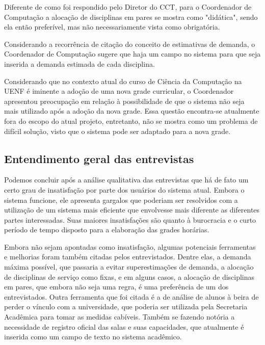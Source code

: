         Diferente de como foi respondido pelo Diretor do CCT, para o Coordenador de Computação a alocação de disciplinas em pares se mostra como "didática", sendo ela então preferível, mas não necessariamente vista como obrigatória.

        Considerando a recorrência de citação do conceito de estimativas de demanda, o Coordenador de Computação sugere que haja um campo no sistema para que seja inserida a demanda estimada de cada disciplina.

        Considerando que no contexto atual do curso de Ciência da Computação na UENF é iminente a adoção de uma nova grade curricular, o Coordenador apresentou preocupação em relação à possibilidade de que o sistema não seja mais utilizado após a adoção da nova grade. Essa questão encontra-se atualmente fora do escopo do atual projeto, entretanto, não se mostra como um problema de difícil solução, visto que o sistema pode ser adaptado para a nova grade.

    \subsection{Entendimento geral das entrevistas} %

        Podemos concluir após a análise qualitativa das entrevistas que há de fato um certo grau de insatisfação por parte dos usuários do sistema atual. Embora o sistema funcione, ele apresenta gargalos que poderiam ser resolvidos com a utilização de um sistema mais eficiente que envolvesse mais diferente as diferentes partes interessadas. Suas maiores insatisfações são quanto à burocracia e o curto período de tempo disposto para a elaboração das grades horárias.

        Embora não sejam apontadas como insatisfação, algumas potenciais ferramentas e melhorias foram também citadas pelos entrevistados. Dentre elas, a demanda máxima possível, que passaria a evitar superestimações de demanda, a alocação de disciplinas de serviço como fixas, e em alguns casos, a alocação de disciplinas em pares, que embora não seja uma regra, é uma preferência de um dos entrevistados. Outra ferramenta que foi citada é a de análise de alunos à beira de perder o vínculo com a universidade, que poderia ser utilizada pela Secretaria Acadêmica para tomar as medidas cabíveis. Também se fazendo notória a necessidade de registro oficial das salas e suas capacidades, que atualmente é inserida como um campo de texto no sistema acadêmico.

